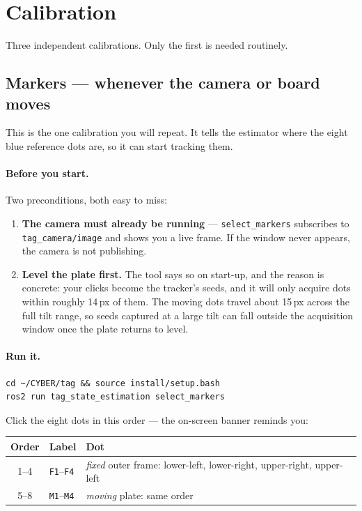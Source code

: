 \documentclass[11pt,a4paper]{article}
\newcommand{\cmd}[1]{\texttt{\small #1}}
\newcommand{\topicname}[1]{\texttt{\small #1}}
\begin{document}
\section{Calibration}

Three independent calibrations. Only the first is needed routinely.

\subsection{Markers --- whenever the camera or board moves}
\label{sec:markers}

This is the one calibration you will repeat. It tells the estimator where the
eight blue reference dots are, so it can start tracking them.

\paragraph{Before you start.} Two preconditions, both easy to miss:
\begin{enumerate}[nosep,left=6mm]
  \item \textbf{The camera must already be running} --- \cmd{select\_markers}
        subscribes to \topicname{tag\_camera/image} and shows you a live frame. If
        the window never appears, the camera is not publishing.
  \item \textbf{Level the plate first.} The tool says so on start-up, and the
        reason is concrete: your clicks become the tracker's seeds, and it will
        only acquire dots within roughly 14\,px of them. The moving dots travel
        about 15\,px across the full tilt range, so seeds captured at a large
        tilt can fall outside the acquisition window once the plate returns to
        level.
\end{enumerate}

\paragraph{Run it.}
\begin{lstlisting}
cd ~/CYBER/tag && source install/setup.bash
ros2 run tag_state_estimation select_markers
\end{lstlisting}

Click the eight dots in this order --- the on-screen banner reminds you:

\begin{center}\small
\begin{tabular}{@{}cll@{}}
\toprule
\textbf{Order} & \textbf{Label} & \textbf{Dot} \\
\midrule
1--4 & \cmd{F1}--\cmd{F4} & \emph{fixed} outer frame: lower-left, lower-right, upper-right, upper-left \\
5--8 & \cmd{M1}--\cmd{M4} & \emph{moving} plate: same order \\
\bottomrule
\end{tabular}
\end{center}
\end{document}
